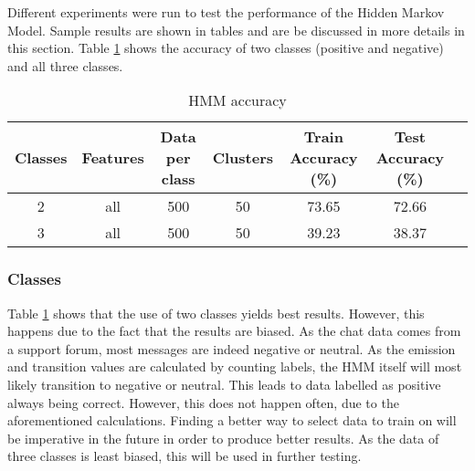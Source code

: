 
\begin{comment}
Experiments / Empirical evaluation (roughly 2-3 pages)
• Any details about experiments (dataset sizes, parameter selection, etc)
• Results
• Analysis (discussion of results / visualization / findings / etc)
\end{comment}



Different experiments were run to test the performance of the Hidden Markov Model. Sample results are shown in tables and are be discussed in more details in this section. Table \ref{table:HMMaccuracy} shows the accuracy of two classes (positive and negative) and all three classes. 
\begin{table}[h!]
\begin{center}
\begin{tabular}{| c | c | c | c | c | c | c |}
\hline
 {\textbf{Classes}} 			& {\textbf{Features}} 
 & {\textbf{Data per class}} 					& {\textbf{Clusters}} 
 & {\textbf{Train Accuracy (\%)}} 					& {\textbf{Test Accuracy (\%)}} 
 \\
\hline
2 			& all 				& 500 		& 50			& 73.65		& 72.66 		\\ %
3 			& all 				& 500 		& 50			& 39.23		& 38.37 		\\
\hline
\end{tabular}
\caption{HMM accuracy}
\label{table:HMMaccuracy}
\end{center}
\end{table}

\subsubsection*{Classes} 
Table \ref{table:HMMaccuracy} shows that the use of two classes yields best results. However, this happens due to the fact that the results are biased. As the chat data comes from a support forum, most messages are indeed negative or neutral. As the emission and transition values are calculated by counting labels, the HMM itself will most likely transition to negative or neutral. This leads to data labelled as positive always being correct. However, this does not happen often, due to the aforementioned calculations. Finding a better way to select data to train on will be imperative in the future in order to produce better results. As the data of three classes is least biased, this will be used in further testing.

